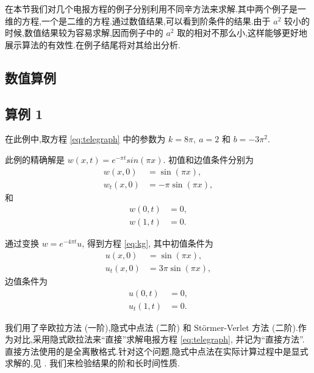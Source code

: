 在本节我们对几个电报方程的例子分别利用不同辛方法来求解.其中两个例子是一维的方程,一个是二维的方程.通过数值结果,可以看到阶条件的结果.由于 $a^2$ 较小的时候,数值结果较为容易求解,因而例子中的 $a^2$ 取的相对不那么小,这样能够更好地展示算法的有效性.在例子结尾将对其给出分析.

\subsection{数值算例}

\subsection*{算例 1}
在此例中,取方程 \eqref{eq:telegraph} 中的参数为 $k = 8\pi,~a = 2$ 和 $b
= -3\pi^2$.

此例的精确解是 $w(x,t) = e^{-\pi t}sin(\pi x)$. 初值和边值条件分别为
\begin{equation*}
\begin{aligned}
w(x,0)&=\sin(\pi x),\\
w_t(x,0)&=-\pi \sin(\pi x),
\end{aligned}
\end{equation*}
和
\begin{equation*}
\begin{aligned}
w(0,t)&=0,\\
w(1,t)&=0.
\end{aligned}
\end{equation*}

通过变换 $w = e^{-4\pi t}u$, 得到方程 \eqref{eq:kg}, 其中初值条件为
\begin{equation*}
\begin{aligned}
u(x,0)&=\sin(\pi x),\\
u_t(x,0)&=3\pi \sin(\pi x),
\end{aligned}
\end{equation*}
边值条件为
\begin{equation*}
\begin{aligned}
u(0,t)&=0,\\
u_t(1,t)&=0.
\end{aligned}
\end{equation*}

我们用了辛欧拉方法 (一阶),隐式中点法 (二阶) 和 St\"{o}rmer-Verlet 方法 (二阶).作为对比,采用隐式欧拉法来``直接''求解电报方程 \eqref{eq:telegraph}, 并记为``直接方法''.直接方法使用的是全离散格式.针对这个问题,隐式中点法在实际计算过程中是显式求解的,见 \cite{feng2010symplectic}. 我们来检验结果的阶和长时间性质.

